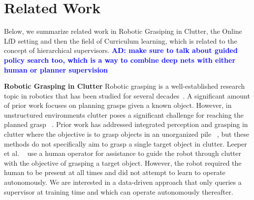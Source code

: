 \documentclass[10pt, conference]{ieeeconf}      %
\newcommand{\adnote}[1]{\ifthenelse{ \boolean{include-notes}}%
 {\textcolor{blue}{\textbf{AD: #1}}}{}}
\newcommand{\mlnote}[1]{\ifthenelse{ \boolean{include-notes}}%
 {\textcolor{purple}{\textbf{ML: #1}}}{}}
\begin{document}


\section{Related Work}
Below, we summarize related work in Robotic Grasiping in Clutter, the Online LfD setting and then the field of
Curriculum learning, which is related to the concept of hierarchical supervisors.\adnote{make sure to talk about guided policy search too, which is a way to combine deep nets with either human or planner supervision}

\noindent \textbf{Robotic Grasping in Clutter}
Robotic grasping is a well-established research topic in robotics that has been studied for several
decades~\cite{bicchi2000robotic}. A significant amount of prior work focuses on planning grasps given a known object.
However, in unstructured environments clutter poses a significant challenge for reaching the planned grasp
~\cite{katz2008can}. Prior work has addressed integrated perception and grasping in clutter where the objective is to
grasp objects in an unorganized pile ~\cite{pinto2015supersizing,nieuwenhuisen2013mobile}, but these methods do not
specifically aim to grasp a single target object in clutter. Leeper et al. ~\cite{} use a human operator for assistance
to guide the robot through clutter with the objective of grasping a target object. However, the robot required the human
to be present at all times and did not attempt to learn to operate autonomously. We are interested in a data-driven
approach that only queries a supervisor at training time and which can operate autonomously thereafter.
\end{document}
